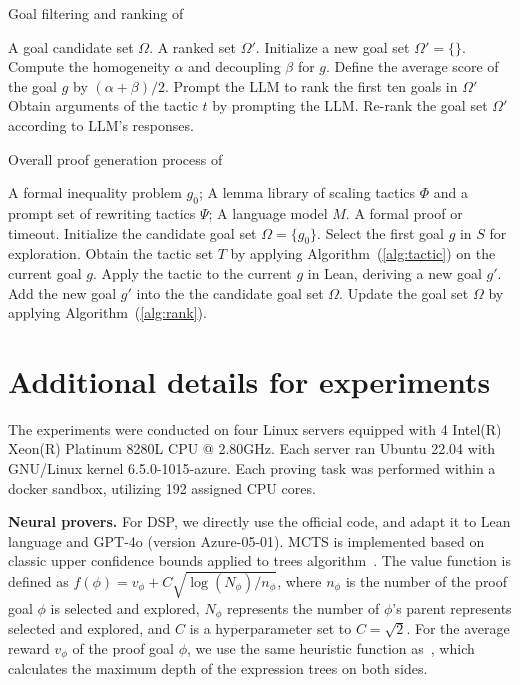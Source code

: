 \begin{algorithm}[h] 
\caption{Goal filtering and ranking of \name} 
\label{alg:rank}
\begin{algorithmic}[1]
\Require A goal candidate set $\Omega$.
\Ensure A ranked set $\Omega'$.
\State Initialize a new goal set $\Omega' = \{\}$.
    \State Compute the homogeneity $\alpha$ and decoupling $\beta$ for $g$.
    \State Define the average score of the goal $g$ by $(\alpha + \beta)/2$.
\EndFor
\State Prompt the LLM to rank the first ten goals in $\Omega'$ {}
    \State Obtain arguments of the tactic $t$ by prompting the LLM.
    \State Re-rank the goal set $\Omega'$ according to LLM's responses.
\end{algorithmic}
\end{algorithm}
\begin{algorithm}[h]
\caption{Overall proof generation process of \name} 
\label{alg:proof}
\begin{algorithmic}[1]
\Require A formal inequality problem $g_0$; A lemma library of scaling tactics $\Phi$ and a prompt set of rewriting tactics $\Psi$; A language model $M$.
\Ensure A formal proof or timeout. 
\State Initialize the candidate goal set $\Omega = \{g_0\}$.
    \State Select the first goal $g$ in $S$ for exploration.
    \State Obtain the tactic set $T$ by applying Algorithm~(\ref{alg:tactic}) on the current goal $g$.
     {}
    \State Apply the tactic to the current $g$ in Lean, deriving a new goal $g'$.
    \State Add the new goal $g'$ into the the candidate goal set $\Omega$.
    \EndFor
    \State Update the goal set $\Omega$ by applying Algorithm~(\ref{alg:rank}).
\EndFor
\end{algorithmic}
\end{algorithm}


\section{Additional details for experiments} \label{app:exp_details}

The experiments were conducted on four Linux servers equipped with 4 Intel(R) Xeon(R) Platinum 8280L CPU @ 2.80GHz. 
Each server ran Ubuntu 22.04 with GNU/Linux kernel 6.5.0-1015-azure. 
Each proving task was performed within a docker sandbox, utilizing 192 assigned CPU cores.

\textbf{Neural provers. } 
For DSP, we directly use the official code, and adapt it to Lean language and GPT-4o (version Azure-05-01). 
MCTS is implemented based on classic upper confidence bounds applied to trees algorithm~\citep{kocsis2006bandit}. 
The value function is defined as $f(\phi) = v_\phi + C \sqrt{\log(N_\phi)/n_\phi}$, where
$n_\phi$ is the number of the proof goal $\phi$ is selected and explored, $N_\phi$ represents the number of $\phi$'s parent represents selected and explored, and $C$ is a hyperparameter set to $C = \sqrt{2}$.
For the average reward $v_\phi$ of the proof goal $\phi$, we use the same heuristic function as~\citet{wei2024proving}, which calculates the maximum depth of the expression trees on both sides.


